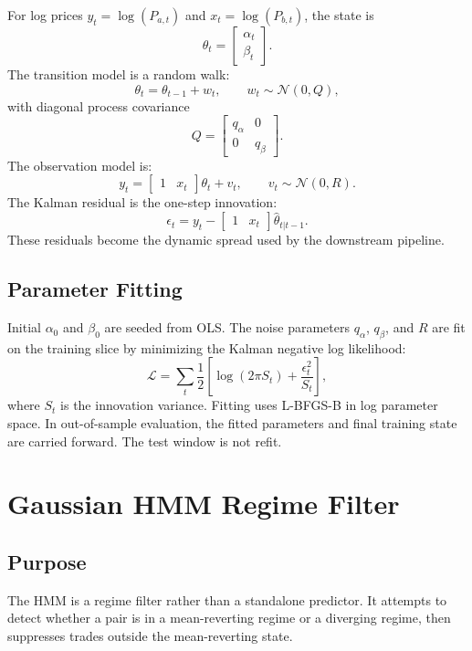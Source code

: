 \documentclass[11pt]{article}
\begin{document}
For log prices \(y_t=\log(P_{a,t})\) and \(x_t=\log(P_{b,t})\), the state is
\[
\theta_t =
\begin{bmatrix}
\alpha_t\\
\beta_t
\end{bmatrix}.
\]
The transition model is a random walk:
\[
\theta_t = \theta_{t-1} + w_t,
\qquad
w_t \sim \mathcal{N}(0,Q),
\]
with diagonal process covariance
\[
Q =
\begin{bmatrix}
q_\alpha & 0\\
0 & q_\beta
\end{bmatrix}.
\]
The observation model is:
\[
y_t =
\begin{bmatrix}
1 & x_t
\end{bmatrix}
\theta_t + v_t,
\qquad
v_t \sim \mathcal{N}(0,R).
\]
The Kalman residual is the one-step innovation:
\[
\epsilon_t = y_t -
\begin{bmatrix}
1 & x_t
\end{bmatrix}
\hat{\theta}_{t|t-1}.
\]
These residuals become the dynamic spread used by the downstream pipeline.

\subsection{Parameter Fitting}

Initial \(\alpha_0\) and \(\beta_0\) are seeded from OLS. The noise parameters
\(q_\alpha\), \(q_\beta\), and \(R\) are fit on the training slice by
minimizing the Kalman negative log likelihood:
\[
\mathcal{L}
=
\sum_t
\frac{1}{2}\left[
\log(2\pi S_t) + \frac{\epsilon_t^2}{S_t}
\right],
\]
where \(S_t\) is the innovation variance. Fitting uses L-BFGS-B in log
parameter space. In out-of-sample evaluation, the fitted parameters and final
training state are carried forward. The test window is not refit.

\section{Gaussian HMM Regime Filter}

\subsection{Purpose}

The HMM is a regime filter rather than a standalone predictor. It attempts to
detect whether a pair is in a mean-reverting regime or a diverging regime, then
suppresses trades outside the mean-reverting state.
\end{document}
